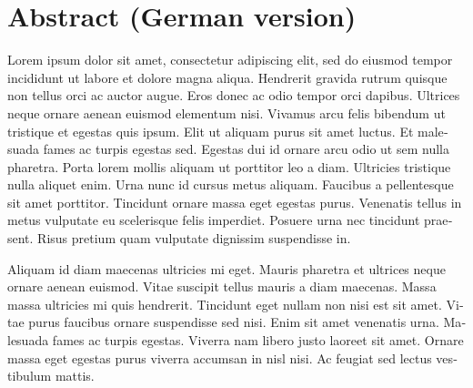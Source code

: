 


\chapter*{Abstract (German version)}

\begin{otherlanguage}{ngerman}
  Lorem ipsum dolor sit amet, consectetur adipiscing elit, sed do eiusmod tempor incididunt ut labore et dolore magna aliqua. Hendrerit gravida rutrum quisque non tellus orci ac auctor augue. Eros donec ac odio tempor orci dapibus. Ultrices neque ornare aenean euismod elementum nisi. Vivamus arcu felis bibendum ut tristique et egestas quis ipsum. Elit ut aliquam purus sit amet luctus. Et malesuada fames ac turpis egestas sed. Egestas dui id ornare arcu odio ut sem nulla pharetra. Porta lorem mollis aliquam ut porttitor leo a diam. Ultricies tristique nulla aliquet enim. Urna nunc id cursus metus aliquam. Faucibus a pellentesque sit amet porttitor. Tincidunt ornare massa eget egestas purus. Venenatis tellus in metus vulputate eu scelerisque felis imperdiet. Posuere urna nec tincidunt praesent. Risus pretium quam vulputate dignissim suspendisse in.

  Aliquam id diam maecenas ultricies mi eget. Mauris pharetra et ultrices neque ornare aenean euismod. Vitae suscipit tellus mauris a diam maecenas. Massa massa ultricies mi quis hendrerit. Tincidunt eget nullam non nisi est sit amet. Vitae purus faucibus ornare suspendisse sed nisi. Enim sit amet venenatis urna. Malesuada fames ac turpis egestas. Viverra nam libero justo laoreet sit amet. Ornare massa eget egestas purus viverra accumsan in nisl nisi. Ac feugiat sed lectus vestibulum mattis.
\end{otherlanguage}